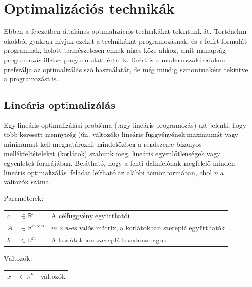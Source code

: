 
\chapter{Optimalizációs technikák}\label{chap:optimalization}
Ebben a fejezetben általános optimalizációs technikákat tekintünk át. Történelmi okokból gyakran hívjuk ezeket a technikákat programozásnak, és a felírt formulát programnak, holott természetesen ennek nincs köze ahhoz, amit manapság programozás illetve program alatt értünk. Ezért is a modern szakirodalom preferálja az optimalizálás szó használatát, de még mindig szinonimaként tekintve a programozást is.

\section{Lineáris optimalizálás}\label{sec:LP}

Egy lineáris optimalizálási probléma (vagy lineáris programozás) azt jelenti, hogy több keresett mennyiség (ún. változók) lineáris függvényének maximumát vagy minimumát kell meghatározni, mindeközben a rendszerre bizonyos mellékfeltételeket (korlátok) szabunk meg, lineáris egyenlőtlenségek vagy egyenletek formájában.
Belátható, hogy a fenti definíciónak megfelelő minden lineáris optimalizálási feladat leírható az alábbi tömör formában, ahol $n$ a változók száma.

Paraméterek:

\begin{tabular}{lll}
	$c$ & $\in \mathbb{R}^n$   & A célfüggvény együtthatói \\
	$A$ & $\in \mathbb{R}^{m×n}$  & $m × n$-es valós mátrix, a korlátokban szereplő együtthatók \\
	$b$ & $\in \mathbb{R}^m$   & A korlátokban szereplő konstans tagok \\
\end{tabular}

Változók:

\begin{tabular}{lll}
	$x$ & $\in \mathbb{R}^n$ & változók \\
\end{tabular}

